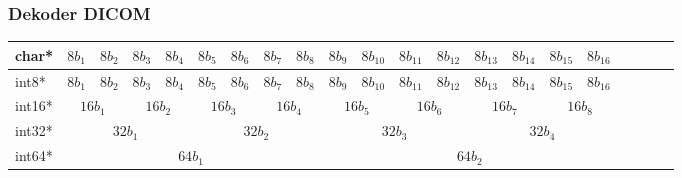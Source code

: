 \documentclass[aspectratio=169]{beamer}
\begin{document}
\begin{frame}[t]
    \frametitle{Dekoder DICOM}
    \begin{center}
        \footnotesize
        \def\arraystretch{1.5}
        \setlength{\tabcolsep}{5pt}
        \begin{tabular}{|l|c|c|c|c|c|c|c|c|c|c|c|c|c|c|c|c|c|c|c|c|}
            \hline
            char*  & $8b_1$                        & $8b_2$                        & $8b_3$                        & $8b_4$                        & $8b_5$                        & $8b_6$                        & $8b_7$                        & $8b_8$                        & $8b_9$ & $8b_{10}$ & $8b_{11}$ & $8b_{12}$ & $8b_{13}$ & $8b_{14}$ & $8b_{15}$ & $8b_{16}$ \\
            \hline
            int8*  & $8b_1$                        & $8b_2$                        & $8b_3$                        & $8b_4$                        & $8b_5$                        & $8b_6$                        & $8b_7$                        & $8b_8$                        & $8b_9$ & $8b_{10}$ & $8b_{11}$ & $8b_{12}$ & $8b_{13}$ & $8b_{14}$ & $8b_{15}$ & $8b_{16}$ \\
            \hline
            int16* & \multicolumn{2}{|c|}{$16b_1$} & \multicolumn{2}{|c|}{$16b_2$} & \multicolumn{2}{|c|}{$16b_3$} & \multicolumn{2}{|c|}{$16b_4$} & \multicolumn{2}{|c|}{$16b_5$} & \multicolumn{2}{|c|}{$16b_6$} & \multicolumn{2}{|c|}{$16b_7$} & \multicolumn{2}{|c|}{$16b_8$}                                                                                              \\
            \hline
            int32* & \multicolumn{4}{|c|}{$32b_1$} & \multicolumn{4}{|c|}{$32b_2$} & \multicolumn{4}{|c|}{$32b_3$} & \multicolumn{4}{|c|}{$32b_4$}                                                                                                                                                                                                                              \\
            \hline
            int64* & \multicolumn{8}{|c|}{$64b_1$} & \multicolumn{8}{|c|}{$64b_2$}                                                                                                                                                                                                                                                                                              \\
            \hline
        \end{tabular}
    \end{center}



\end{frame}
\end{document}
